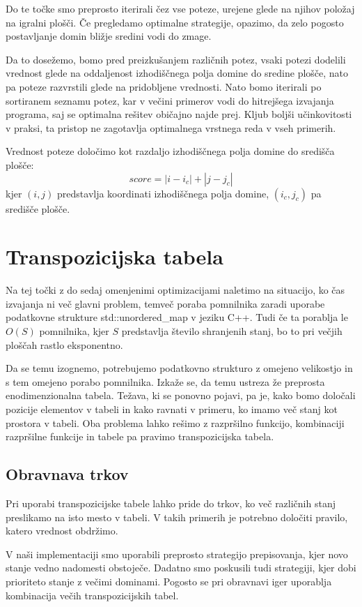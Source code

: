 \documentclass[12pt]{report}
\begin{document}
Do te točke smo preprosto iterirali čez vse poteze, urejene glede na njihov položaj na igralni plošči. Če pregledamo optimalne strategije, opazimo, da zelo pogosto postavljanje domin bližje sredini vodi do zmage. 

Da to dosežemo, bomo pred preizkušanjem različnih potez, vsaki potezi dodelili vrednost glede na oddaljenost izhodiščnega polja domine do sredine plošče, nato pa poteze razvrstili glede na pridobljene vrednosti. Nato bomo iterirali po sortiranem seznamu potez, kar v večini primerov vodi do hitrejšega izvajanja programa, saj se optimalna rešitev običajno najde prej. Kljub boljši učinkovitosti v praksi, ta pristop ne zagotavlja optimalnega vrstnega reda v vseh primerih. 

Vrednost poteze določimo kot razdaljo izhodiščnega polja domine do središča plošče:
\[
score = |i - i_c| + |j - j_c|
\]
kjer $(i, j)$ predstavlja koordinati izhodiščnega polja domine, $(i_c, j_c)$ pa središče plošče.

\section{Transpozicijska tabela}
Na tej točki z do sedaj omenjenimi optimizacijami naletimo na situacijo, ko čas izvajanja ni več glavni problem, temveč poraba pomnilnika zaradi uporabe podatkovne strukture std::unordered\_map v jeziku C++. Tudi če ta porablja le $O(S)$ pomnilnika, kjer $S$ predstavlja število shranjenih stanj, bo to pri večjih ploščah rastlo eksponentno.

Da se temu izognemo, potrebujemo podatkovno strukturo z omejeno velikostjo in s tem omejeno porabo pomnilnika. Izkaže se, da temu ustreza že preprosta enodimenzionalna tabela. Težava, ki se ponovno pojavi, pa je, kako bomo določali pozicije elementov v tabeli in kako ravnati v primeru, ko imamo več stanj kot prostora v tabeli. Oba problema lahko rešimo z razpršilno funkcijo, kombinaciji razpršilne funkcije in tabele pa pravimo transpozicijska tabela.

\subsection*{Obravnava trkov}
Pri uporabi transpozicijske tabele lahko pride do trkov, ko več različnih stanj preslikamo na isto mesto v tabeli. V takih primerih je potrebno določiti pravilo, katero vrednost obdržimo.

V naši implementaciji smo uporabili preprosto strategijo prepisovanja, kjer novo stanje vedno nadomesti obstoječe. Dadatno smo poskusili tudi strategiji, kjer dobi prioriteto stanje z večimi dominami. Pogosto se pri obravnavi iger uporablja kombinacija večih transpozicijskih tabel.
\end{document}
